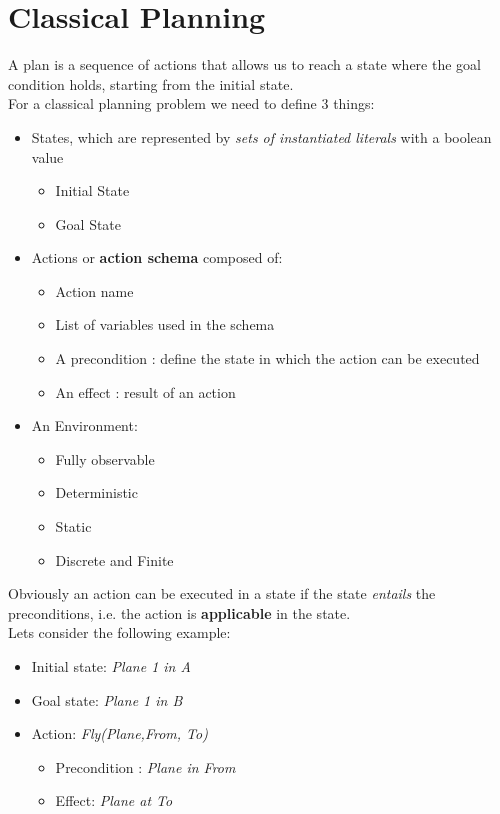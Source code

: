 \documentclass[5pt,a4paper]{article}
\begin{document}
\section{Classical Planning}
A plan is a sequence of actions that allows us to reach a state where the goal condition holds, starting from the initial state.\\
For a classical planning problem we need to define 3 things:
\begin{itemize}
\item States, which are represented by \textit{sets of instantiated literals} with a boolean value
\begin{itemize}
\item Initial State
\item Goal State
\end{itemize}

\item Actions or \textbf{action schema} composed of:
\begin{itemize}
\item Action name
\item List of variables used in the schema
\item A precondition : define the state in which the action can be executed
\item An effect : result of an action
\end{itemize}
\item An Environment:
\begin{itemize}

\item Fully observable
\item Deterministic
\item Static
\item Discrete and Finite
\end{itemize}
\end{itemize}


Obviously an action can be executed in a state if the state \textit{entails} the preconditions, i.e. the action is \textbf{applicable} in the state.\\

Lets consider the following example:

\begin{itemize}
\item Initial state: \textit{Plane 1 in A}
\item Goal state: \textit{Plane 1 in B}

\item Action: \textit{Fly(Plane,From, To)}
\begin{itemize}
\item Precondition : \textit{Plane in From}
\item Effect: \textit{Plane at To}
\end{itemize}
\end{itemize}
\end{document}
